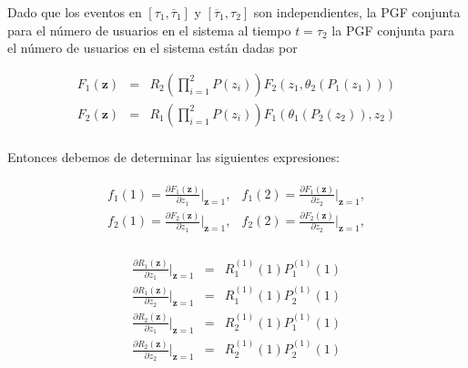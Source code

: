 Dado que los eventos en
$\left[\tau_{1},\overline{\tau}_{1}\right]$ y
$\left[\overline{\tau}_{1},\tau_{2}\right]$ son independientes, la
PGF conjunta para el n\'umero de usuarios en el sistema al tiempo
$t=\tau_{2}$ la PGF conjunta para el n\'umero de usuarios en el sistema est\'an dadas por

{\footnotesize{
\begin{eqnarray*}
F_{1}\left(\mathbf{z}\right)&=&R_{2}\left(\prod_{i=1}^{2}P\left(z_{i}\right)\right)F_{2}\left(z_{1},\theta_{2}\left(P_{1}\left(z_{1}\right)\right)\right)\\
F_{2}\left(\mathbf{z}\right)&=&R_{1}\left(\prod_{i=1}^{2}P\left(z_{i}\right)\right)F_{1}\left(\theta_{1}\left(P_{2}\left(z_{2}\right)\right),z_{2}\right)\\
\end{eqnarray*}}}


Entonces debemos de determinar las siguientes expresiones:


\begin{eqnarray*}
\begin{array}{cc}
f_{1}\left(1\right)=\frac{\partial F_{1}\left(\mathbf{z}\right)}{\partial z_{1}}|_{\mathbf{z}=1}, & f_{1}\left(2\right)=\frac{\partial F_{1}\left(\mathbf{z}\right)}{\partial z_{2}}|_{\mathbf{z}=1},\\
f_{2}\left(1\right)=\frac{\partial F_{2}\left(\mathbf{z}\right)}{\partial z_{1}}|_{\mathbf{z}=1}, & f_{2}\left(2\right)=\frac{\partial F_{2}\left(\mathbf{z}\right)}{\partial z_{2}}|_{\mathbf{z}=1},\\
\end{array}
\end{eqnarray*}


\begin{eqnarray*}
\frac{\partial R_{1}\left(\mathbf{z}\right)}{\partial
z_{1}}|_{\mathbf{z}=1}&=&R_{1}^{(1)}\left(1\right)P_{1}^{(1)}\left(1\right)\\
\frac{\partial R_{1}\left(\mathbf{z}\right)}{\partial
z_{2}}|_{\mathbf{z}=1}&=&R_{1}^{(1)}\left(1\right)P_{2}^{(1)}\left(1\right)\\
\frac{\partial R_{2}\left(\mathbf{z}\right)}{\partial
z_{1}}|_{\mathbf{z}=1}&=&R_{2}^{(1)}\left(1\right)P_{1}^{(1)}\left(1\right)\\
\frac{\partial R_{2}\left(\mathbf{z}\right)}{\partial
z_{2}}|_{\mathbf{z}=1}&=&R_{2}^{(1)}\left(1\right)P_{2}^{(1)}\left(1\right)\\
\end{eqnarray*}



